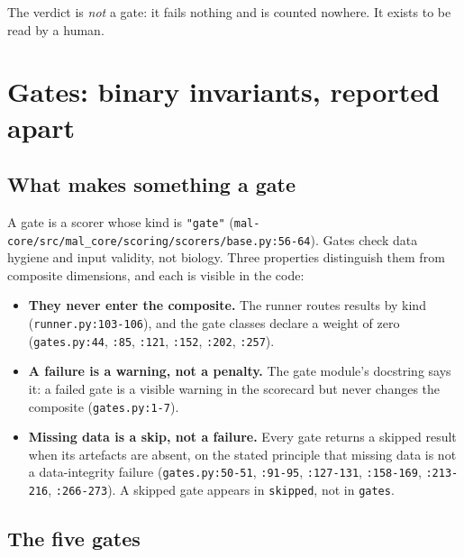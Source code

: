 \documentclass[11pt,a4paper]{article}
\newcommand{\code}[1]{\texttt{#1}}
\begin{document}
The verdict is \emph{not} a gate: it fails nothing and is counted nowhere. It
exists to be read by a human.

\section{Gates: binary invariants, reported apart}

\subsection{What makes something a gate}

A gate is a scorer whose kind is \code{"gate"}
(\code{mal-core/src/mal\_core/scoring/scorers/base.py:56-64}). Gates check
data hygiene and input validity, not biology. Three properties distinguish
them from composite dimensions, and each is visible in the code:

\begin{itemize}
\item \textbf{They never enter the composite.} The runner routes results by
      kind (\code{runner.py:103-106}), and the gate classes declare a weight
      of zero (\code{gates.py:44}, \code{:85}, \code{:121}, \code{:152},
      \code{:202}, \code{:257}).
\item \textbf{A failure is a warning, not a penalty.} The gate module's
      docstring says it: a failed gate is a visible warning in the scorecard
      but never changes the composite (\code{gates.py:1-7}).
\item \textbf{Missing data is a skip, not a failure.} Every gate returns a
      skipped result when its artefacts are absent, on the stated principle
      that missing data is not a data-integrity failure (\code{gates.py:50-51},
      \code{:91-95}, \code{:127-131}, \code{:158-169}, \code{:213-216},
      \code{:266-273}). A skipped gate appears in \code{skipped}, not in
      \code{gates}.
\end{itemize}

\subsection{The five gates}
\end{document}
